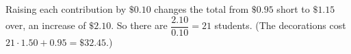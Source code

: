 Raising each contribution by $\$0.10$ changes the total from $\$0.95$ short to $\$1.15$ over, an increase of $\$2.10$. So there are $\dfrac{2.10}{0.10}=\boxed{21}$ students. (The decorations cost $21\cdot1.50+0.95=\$32.45$.)
